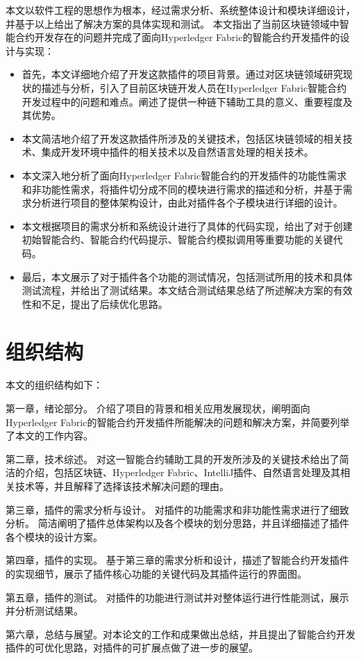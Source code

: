 本文以软件工程的思想作为根本，经过需求分析、系统整体设计和模块详细设计，并基于以上给出了解决方案的具体实现和测试。
本文指出了当前区块链领域中智能合约开发存在的问题并完成了面向Hyperledger Fabric的智能合约开发插件的设计与实现：

\begin{itemize}
    \item 首先，本文详细地介绍了开发这款插件的项目背景。通过对区块链领域研究现状的描述与分析，引入了目前区块链开发人员在Hyperledger Fabric智能合约开发过程中的问题和难点。阐述了提供一种链下辅助工具的意义、重要程度及其优势。
    \item 本文简洁地介绍了开发这款插件所涉及的关键技术，包括区块链领域的相关技术、集成开发环境中插件的相关技术以及自然语言处理的相关技术。
    \item 本文深入地分析了面向Hyperledger Fabric智能合约的开发插件的功能性需求和非功能性需求，将插件切分成不同的模块进行需求的描述和分析，并基于需求分析进行项目的整体架构设计，由此对插件各个子模块进行详细的设计。
    \item 本文根据项目的需求分析和系统设计进行了具体的代码实现，给出了对于创建初始智能合约、智能合约代码提示、智能合约模拟调用等重要功能的关键代码。
    \item 最后，本文展示了对于插件各个功能的测试情况，包括测试所用的技术和具体测试流程，并给出了测试结果。本文结合测试结果总结了所述解决方案的有效性和不足，提出了后续优化思路。
\end{itemize}

\section{组织结构}

本文的组织结构如下：

第一章，绪论部分。
介绍了项目的背景和相关应用发展现状，阐明面向Hyperledger Fabric的智能合约开发插件所能解决的问题和解决方案，并简要列举了本文的工作内容。

第二章，技术综述。
对这一智能合约辅助工具的开发所涉及的关键技术给出了简洁的介绍，包括区块链、Hyperledger Fabric、IntelliJ插件、自然语言处理及其相关技术等，并且解释了选择该技术解决问题的理由。

第三章，插件的需求分析与设计。
对插件的功能需求和非功能性需求进行了细致分析。
简洁阐明了插件总体架构以及各个模块的划分思路，并且详细描述了插件各个模块的设计方案。

第四章，插件的实现。
基于第三章的需求分析和设计，描述了智能合约开发插件的实现细节，展示了插件核心功能的关键代码及其插件运行的界面图。

第五章，插件的测试。
对插件的功能进行测试并对整体运行进行性能测试，展示并分析测试结果。

第六章，总结与展望。对本论文的工作和成果做出总结，并且提出了智能合约开发插件的可优化思路，对插件的可扩展点做了进一步的展望。
